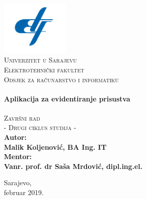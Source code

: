 \begin{titlepage}
\begin{center}


\includegraphics[width=0.25\textwidth]{material/etf-logo.png}~\\[0.1cm]
\textsc{\Large Univerzitet u Sarajevu}\\[0.2cm]  
\textsc{\Large Elektrotehnički fakultet}\\[0.2cm] 
\textsc{\Large Odsjek za računarstvo i informatiku}\\[3cm]\HRule \\[0.5cm] 
{\huge \bfseries Aplikacija za evidentiranje prisustva} \\[0.4cm] 
\HRule \\[0.5cm]

\textsc{\Large Završni rad}\\[0.4cm]
\textsc{\Large - Drugi ciklus studija - }\\[1.5cm]

\textbf{ 
\Large Autor:\\  
\Large Malik Koljenović, BA Ing. IT\\[1cm]  
\Large Mentor: \\[0.2cm] 
\Large Vanr. prof. dr Saša Mrdović, dipl.ing.el.} 
\vfill

{\large Sarajevo, \\februar 2019.}

\end{center} 
\end{titlepage}
